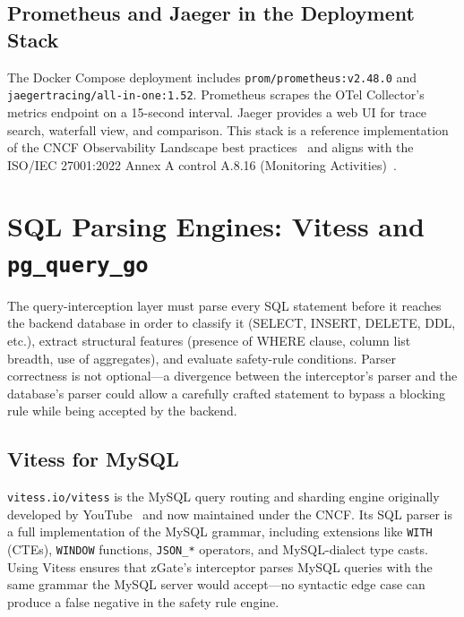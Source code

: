 \subsection{Prometheus and Jaeger in the Deployment Stack}

The Docker Compose deployment includes \texttt{prom/prometheus:v2.48.0} and \texttt{jaegertracing/all-in-one:1.52}. Prometheus scrapes the OTel Collector's metrics endpoint on a 15-second interval. Jaeger provides a web UI for trace search, waterfall view, and comparison. This stack is a reference implementation of the CNCF Observability Landscape best practices~\cite{cncf-landscape} and aligns with the ISO/IEC 27001:2022 Annex A control A.8.16 (Monitoring Activities)~\cite{iso27001-2022}.

\section{SQL Parsing Engines: Vitess and \texttt{pg\_query\_go}}
\label{sec:sql-parsing}

The query-interception layer must parse every SQL statement before it reaches the backend database in order to classify it (SELECT, INSERT, DELETE, DDL, etc.), extract structural features (presence of WHERE clause, column list breadth, use of aggregates), and evaluate safety-rule conditions. Parser correctness is not optional---a divergence between the interceptor's parser and the database's parser could allow a carefully crafted statement to bypass a blocking rule while being accepted by the backend.

\subsection{Vitess for MySQL}

\texttt{vitess.io/vitess} is the MySQL query routing and sharding engine originally developed by YouTube~\cite{vitess-docs} and now maintained under the CNCF. Its SQL parser is a full implementation of the MySQL grammar, including extensions like \texttt{WITH} (CTEs), \texttt{WINDOW} functions, \texttt{JSON\_*} operators, and MySQL-dialect type casts. Using Vitess ensures that zGate's interceptor parses MySQL queries with the same grammar the MySQL server would accept---no syntactic edge case can produce a false negative in the safety rule engine.

